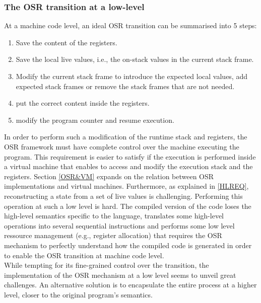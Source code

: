 \subsubsection{The OSR transition at a low-level}
At a machine code level, an ideal OSR transition can be summarised into 5 steps: 
\begin{enumerate}
    \item Save the content of the registers.
    \item Save the local live values, i.e., the on-stack values in the current stack frame.
    \item Modify the current stack frame to introduce the expected local values, add expected stack frames or remove the stack frames that are not needed.
    \item put the correct content inside the registers.
    \item modify the program counter and resume execution.
\end{enumerate}
In order to perform such a modification of the runtime stack and registers, the OSR framework must have complete control over the machine executing the program.
This requirement is easier to satisfy if the execution is performed inside a virtual machine that enables to access and modify the execution stack and the registers.
Section \ref{OSR&VM} expands on the relation between OSR implementations and virtual machines.
Furthermore, as explained in \ref{HLREQ}, reconstructing a state from a set of live values is challenging. 
Performing this operation at such a low level is hard.
The compiled version of the code loses the high-level semantics specific to the language, translates some high-level operations into several sequential instructions and performs some low level ressource management (e.g., register allocation) that requires the OSR mechanism to perfectly understand how the compiled code is generated in order to enable the OSR transition at machine code level.\\

While tempting for its fine-grained control over the transition, the implementation of the OSR mechanism at a low level seems to unveil great challenges.
An alternative solution is to encapsulate the entire process at a higher level, closer to the original program's semantics.

